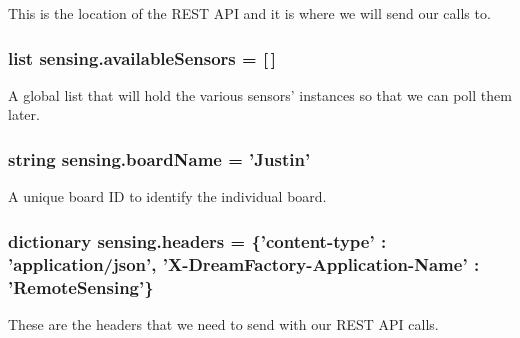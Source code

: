 This is the location of the R\-E\-S\-T A\-P\-I and it is where we will send our calls to. 

\hypertarget{namespacesensing_a46ffa95be1accb04ea0a2c0b89b217c0}{
\subsubsection[{available\-Sensors}]{\setlength{\rightskip}{0pt plus 5cm}list sensing.\-available\-Sensors = \mbox{[}$\,$\mbox{]}}}\label{namespacesensing_a46ffa95be1accb04ea0a2c0b89b217c0}


A global list that will hold the various sensors' instances so that we can poll them later. 

\hypertarget{namespacesensing_a7d59d9b021482661d93cbf2120dfa030}{
\subsubsection[{board\-Name}]{\setlength{\rightskip}{0pt plus 5cm}string sensing.\-board\-Name = 'Justin'}}\label{namespacesensing_a7d59d9b021482661d93cbf2120dfa030}


A unique board I\-D to identify the individual board. 

\hypertarget{namespacesensing_a10bdd4ea61df5e84854a462509e3c7d5}{
\subsubsection[{headers}]{\setlength{\rightskip}{0pt plus 5cm}dictionary sensing.\-headers = \{'content-\/type' \-: 'application/json', 'X-\/Dream\-Factory-\/Application-\/Name' \-: 'Remote\-Sensing'\}}}\label{namespacesensing_a10bdd4ea61df5e84854a462509e3c7d5}


These are the headers that we need to send with our R\-E\-S\-T A\-P\-I calls. 

